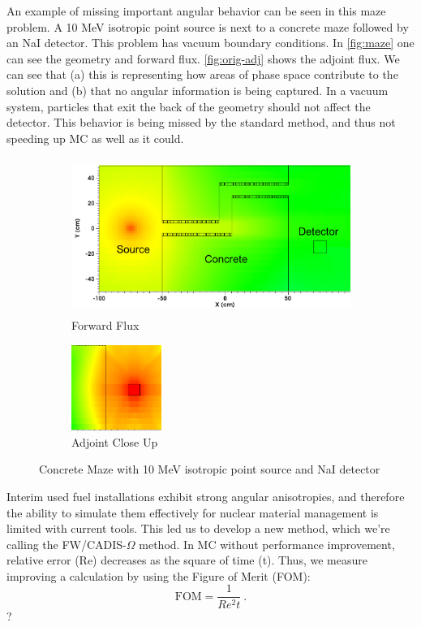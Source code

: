 \documentclass[12pt]{article}
\begin{document}
An example of missing important angular behavior can be seen in this maze problem. 
A 10 MeV isotropic point source is next to a concrete maze followed by an NaI detector. 
This problem has vacuum boundary conditions. 
In \autoref{fig:maze} one can see the geometry and forward flux. 
\autoref{fig:orig-adj} shows the adjoint flux. 
We can see that (a) this is representing how areas of phase space contribute to the solution and (b) that no angular information is being captured.
In a vacuum system, particles that exit the back of the geometry should not affect the detector. 
This behavior is being missed by the standard method, and thus not speeding up MC as well as it could. 
\begin{figure}
\centering
\begin{subfigure}{.75\textwidth}
  \centering
  \includegraphics[height=2in,clip]{maze-forward.png}
  \caption{Forward Flux}
  \label{fig:maze}
\end{subfigure}%
\begin{subfigure}{.25\textwidth}
  \centering
  \includegraphics[height=1.1in,clip]{maze-adj-orig.png}
  \caption{Adjoint Close Up}
  \label{fig:orig-adj}
\end{subfigure}
\caption{Concrete Maze with 10 MeV isotropic point source and NaI detector}
\label{fig:adjoint}
\end{figure}

Interim used fuel installations exhibit strong angular anisotropies, and therefore the ability to simulate them effectively for nuclear material management is limited with current tools. 
This led us to develop a new method, which we're calling the FW/CADIS-$\Omega$ method. 
In MC without performance improvement, relative error (Re) decreases as the square of time (t). 
Thus, we measure improving a calculation by using the Figure of Merit (FOM):
\begin{equation}
\text{FOM}=\frac{1}{Re^{2}t}\:.
\end{equation}?
\end{document}
